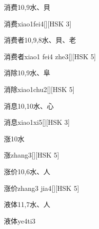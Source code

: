 \begin{entry}{消费}{10,9}{⽔、⾙}
  \begin{phonetics}{消费}{xiao1fei4}[][HSK 3]
  \end{phonetics}
\end{entry}

\begin{entry}{消费者}{10,9,8}{⽔、⾙、⽼}
  \begin{phonetics}{消费者}{xiao1 fei4 zhe3}[][HSK 5]
  \end{phonetics}
\end{entry}

\begin{entry}{消除}{10,9}{⽔、⾩}
  \begin{phonetics}{消除}{xiao1chu2}[][HSK 5]
  \end{phonetics}
\end{entry}

\begin{entry}{消息}{10,10}{⽔、⼼}
  \begin{phonetics}{消息}{xiao1xi5}[][HSK 3]
  \end{phonetics}
\end{entry}

\begin{entry}{涨}{10}{⽔}
  \begin{phonetics}{涨}{zhang3}[][HSK 5]
  \end{phonetics}
\end{entry}

\begin{entry}{涨价}{10,6}{⽔、⼈}
  \begin{phonetics}{涨价}{zhang3 jia4}[][HSK 5]
  \end{phonetics}
\end{entry}

\begin{entry}{液体}{11,7}{⽔、⼈}
  \begin{phonetics}{液体}{ye4ti3}
  \end{phonetics}
\end{entry}

